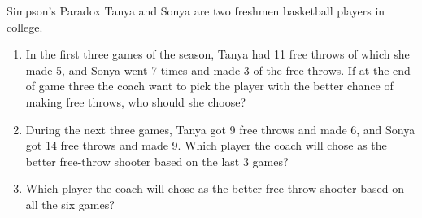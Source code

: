 \documentclass[serif,envcountsect,table,t]{beamer}%
\begin{document}
\begin{frame}{Simpson's Paradox}
  Tanya and Sonya are two freshmen basketball players in college.
  \begin{enumerate}
  \item In the first three games of the season, Tanya had 11 free throws of
    which she made 5, and Sonya went 7 times and made 3 of the free throws.  If
    at the end of game three the coach want to pick the player with the better
    chance of making free throws, who should she choose?
    \pause
  \item During the next three games, Tanya got 9 free throws and made 6, and
    Sonya got 14 free throws and made 9. Which player the coach will chose as
    the better free-throw shooter based on the last 3 games?
    \pause
  \item Which player the coach will chose as the better free-throw shooter based
    on all the six games?

  \end{enumerate}
\end{frame}
\end{document}
